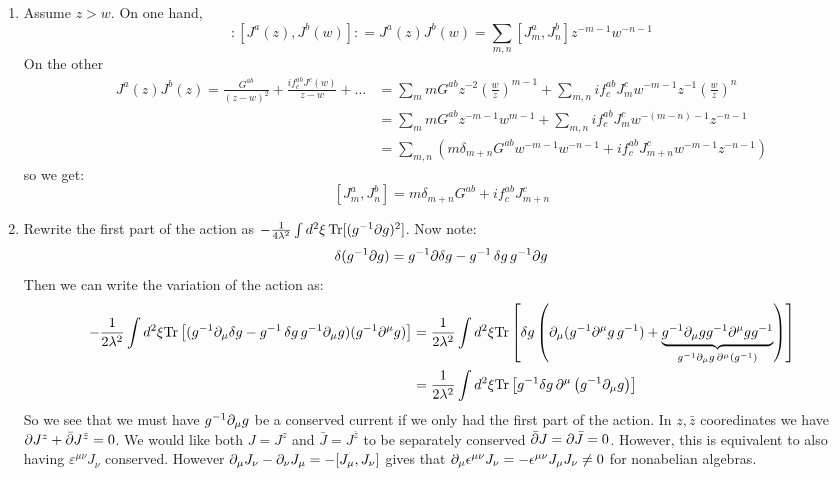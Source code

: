 \documentclass[11pt]{article}
\begin{document}
\begin{enumerate}
	\item Assume $z > w$. On one hand, 
	\[
		:[J^a(z), J^b(w)]: = J^a(z) J^b(w) = \sum_{m, n} [J_m^a, J_n^b] z^{-m-1} w^{-n-1}
	\]
	On the other 
	\[
		\begin{aligned}
		J^a(z) J^b(z) = \frac{G^{ab}}{(z-w)^2} + \frac{i f^{ab}_c J^c(w)}{z-w} + \dots 
		&= \sum_{m} m G^{ab} z^{-2} \left(\frac{w}{z}\right)^{m-1} + \sum_{m,n} i f^{ab}_c J^c_m w^{-m-1} z^{-1} \left( \frac{w}{z} \right)^n\\
		&= \sum_m m G^{ab} z^{-m-1} w^{m-1} + \sum_{m,n} i f^{ab}_c J^c_m w^{-(m-n)-1} z^{-n-1}\\
		&= \sum_{m, n} \left(m \delta_{m+n} G^{ab} w^{-m-1} w^{-n-1} + i f^{ab}_c J^c_{m+n} w^{-m-1} z^{-n-1} \right)
		\end{aligned}
	\]
	so we get:
	\[
		[J^a_m, J^b_n] = m \delta_{m+n} G^{ab} + i f^{ab}_c J^c_{m+n}
	\]
	\item Rewrite the first part of the action as $-\frac{1}{4\lambda^2} \int d^2 \xi\, \mathrm{Tr}[(g^{-1} \partial g)^2]$. Now note:
	\[
		\delta(g^{-1} \partial g) = g^{-1} \partial \delta g - g^{-1}\, \delta g\, g^{-1} \partial g
	\]
	Then we can write the variation of the action as:
	\[
	\begin{aligned}
				- \frac{1}{2 \lambda^2} \int d^2 \xi \mathrm{Tr} \left[ (g^{-1} \partial_\mu \delta g - g^{-1}\, \delta g\, g^{-1} \partial_\mu g) (g^{-1} \partial^\mu g) \right]
				&=  \frac{1}{2 \lambda^2} \int d^2 \xi \mathrm{Tr} \left[ \delta g \left(\partial_\mu(g^{-1} \partial^\mu g\, g^{-1}) + \underbrace{g^{-1} \partial_\mu g g^{-1} \partial^\mu g g^{-1}}_{g^{-1} \partial_\mu g\, \partial^\mu(g^{-1})}\right) \right]\\
		&= \frac{1}{2 \lambda^2} \int d^2 \xi \mathrm{Tr} \left[ g^{-1} \delta g \, \partial^\mu \left(g^{-1} \partial_\mu g \right) \right]		
	\end{aligned}
	\]
	So we see that we must have $g^{-1} \partial_\mu g$ be a conserved current if we only had the first part of the action. In $z, \bar z$ cooredinates we have $\partial J^z + \bar {\partial} J^{\bar z} = 0$. We would like both $J = J^z$ and $\bar J = J^{\bar z}$ to be separately conserved $\bar {\partial} J = \partial \bar J = 0$. However, this is equivalent to also having $\varepsilon^{\mu \nu} J_\nu$ conserved. However $\partial_\mu J_\nu - \partial_\nu J_\mu = -[J_\mu, J_\nu]$ gives that $\partial_\mu \epsilon^{\mu \nu} J_\nu = - \epsilon^{\mu \nu} J_\mu J_\nu \neq 0$ for nonabelian algebras. 
	

\end{enumerate}
\end{document}
